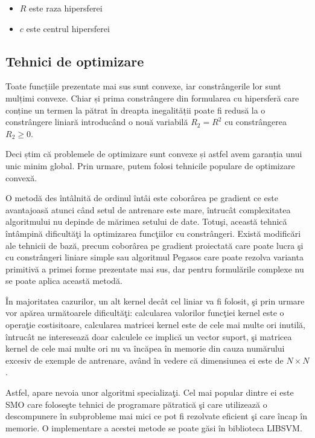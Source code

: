         \begin{itemize}
        \item $R$ este raza hipersferei
        \item $c$ este centrul hipersferei
        \end{itemize}
      
        
\subsection{Tehnici de optimizare}

Toate funcțiile prezentate mai sus sunt convexe, iar constrângerile 
lor sunt mulțimi convexe. Chiar
și prima constrângere din formularea cu hipersferă
care conține un termen la pătrat în dreapta 
inegalității poate fi redusă la o constrângere liniară
introducând o nouă variabilă $R_2 = R ^ 2$ cu constrângerea 
$R_2 \geq 0$.

Deci știm că problemele de optimizare
sunt convexe și astfel avem garanția unui unic minim global. 
Prin urmare, putem folosi 
tehnicile populare de optimizare convexă.

O metodă des întâlnită de ordinul întâi este coborârea pe gradient ce este 
avantajoasă atunci când setul de  antrenare este mare, întrucât 
complexitatea algoritmului nu depinde de mărimea setului de date.
Totuşi, această tehnică întâmpină dificultăţi la optimizarea funcţiilor 
cu constrângeri. Există modificări ale tehnicii de bază, precum coborârea pe 
gradient proiectată care poate lucra şi cu constrângeri liniare simple sau 
algoritmul Pegasos\cite{Pegasos} care poate rezolva varianta primitivă a primei forme prezentate 
mai sus, dar pentru formulările complexe nu se poate aplica această metodă.

În majoritatea cazurilor, un alt kernel decât cel liniar va fi folosit, şi prin urmare 
vor apărea următoarele dificultăţi: calcularea valorilor funcţiei kernel este 
o operaţie costisitoare, calcularea matricei kernel este de cele mai multe ori 
inutilă, întrucât ne interesează doar calculele ce implică un vector suport, şi 
matricea kernel de cele mai multe ori nu va încăpea în memorie din cauza 
numărului excesiv de exemple de antrenare, având în vedere că dimensiunea ei 
este de $N\times N$\cite{SVM-solvers}.

Astfel, apare nevoia unor algoritmi specializaţi. Cel mai popular dintre ei 
este SMO\cite{SMO} care foloseşte tehnici de programare pătratică şi care utilizează 
o descompunere în 
subprobleme mai mici ce pot fi rezolvate eficient şi care încap în memorie.
O implementare a acestei metode se poate găsi în biblioteca LIBSVM\cite{LIBSVM}.


